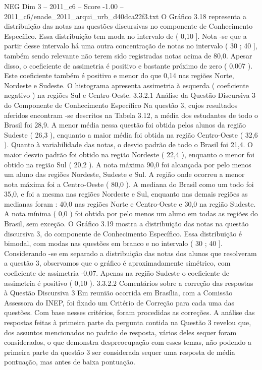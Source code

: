 \begin{textsample}{NEG Dim 3 – 2011\_c6 – Score -1.00 – 2011\_c6/enade\_2011\_arqui\_urb\_d40dca22f3.txt}
O Gráfico 3.18 representa a distribuição das notas nas questões discursivas no componente de Conhecimento Específico.
Essa distribuição tem moda no intervalo de ( 0,10 ].
Nota -se que a partir desse intervalo há uma outra concentração de notas no intervalo ( 30 ; 40 ], também sendo relevante não terem sido registradas notas acima de 80,0.
Apesar disso, o coeficiente de assimetria é positivo e bastante próximo de zero ( 0,007 ).
Este coeficiente também é positivo e menor do que 0,14 nas regiões Norte, Nordeste e Sudeste.
O histograma apresenta assimetria à esquerda ( coeficiente negativo ) na regiões Sul e Centro-Oeste. 3.3.2.1 Análise da Questão Discursiva 3 do Componente de Conhecimento Específico Na questão 3, cujos resultados aferidos encontram -se descritos na Tabela 3.12, a média dos estudantes de todo o Brasil foi 28,9.
A menor média nessa questão foi obtida pelos alunos da região Sudeste ( 26,3 ), enquanto a maior média foi obtida na região Centro-Oeste ( 32,6 ).
Quanto à variabilidade das notas, o desvio padrão de todo o Brasil foi 21,4.
O maior desvio padrão foi obtido na região Nordeste ( 22,4 ), enquanto o menor foi obtido na região Sul ( 20,2 ).
A nota máxima 90,0 foi alcançada por pelo menos um aluno das regiões Nordeste, Sudeste e Sul.
A região onde ocorreu a menor nota máxima foi a Centro-Oeste ( 80,0 ).
A mediana do Brasil como um todo foi 35,0, e foi a mesma nas regiões Nordeste e Sul, enquanto nas demais regiões as medianas foram : 40,0 nas regiões Norte e Centro-Oeste e 30,0 na região Sudeste.
A nota mínima ( 0,0 ) foi obtida por pelo menos um aluno em todas as regiões do Brasil, sem exceção.
O Gráfico 3.19 mostra a distribuição das notas na questão discursiva 3, do componente de Conhecimento Específico.
Essa distribuição é bimodal, com modas nas questões em branco e no intervalo ( 30 ; 40 ].
Considerando -se em separado a distribuição das notas dos alunos que resolveram a questão 3, observamos que o gráfico é aproximadamente simétrico, com coeficiente de assimetria -0,07.
Apenas na região Sudeste o coeficiente de assimetria é positivo ( 0,10 ). 3.3.2.2 Comentários sobre a correção das respostas à Questão Discursiva 3 Em reunião ocorrida em Brasília, com a Comissão Assessora do INEP, foi fixado um Critério de Correção para cada uma das questões.
Com base nesses critérios, foram procedidas as correções.
A análise das respostas feitas à primeira parte da pergunta contida na Questão 3 revelou que, dos assuntos mencionados no padrão de resposta, vários deles sequer foram considerados, o que demonstra despreocupação com esses temas, não podendo a primeira parte da questão 3 ser considerada sequer uma resposta de média pontuação, mas antes de baixa pontuação.

\end{textsample}
